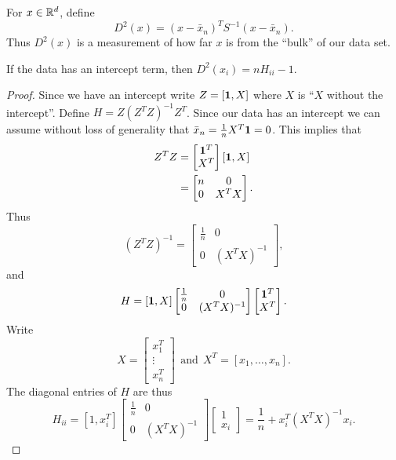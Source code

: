 For $x \in {\mathbb R}^d$, define 
\[D^2(x) = (x-\bar{x}_n)^TS^{-1}(x-\bar{x}_n). \]
Thus $D^2(x)$ is a measurement of how far $x$ is from the ``bulk'' of our data set.
\begin{prop}
    If the data has an intercept term, then $D^2(x_i) = nH_{ii}-1$.
\end{prop}
\begin{proof}
    Since we have an intercept write $Z=[{{\bf 1}}, X]$ where $X$ is ``$X$ without the intercept''. Define $H=Z(Z^TZ)^{-1}Z^T$. Since our data has an intercept we can assume without loss of generality that $\bar{x}_n = \frac{1}{n}X^T{{\bf 1}} = 0$. This implies that
    \begin{align*}
        Z^TZ &= \begin{bmatrix}
            {{\bf 1}}^T\\X^T
        \end{bmatrix}[{{\bf 1}}, X]\\
        &=\begin{bmatrix}
            n&0\\
            0&X^TX
        \end{bmatrix}.
    \end{align*} 
    Thus 
    \[(Z^TZ)^{-1} = \begin{bmatrix}
        \frac{1}{n}&0\\
        0&(X^TX)^{-1}
    \end{bmatrix}, \]
    and 
    \[H = [{{\bf 1}}, X]\begin{bmatrix}
        \frac{1}{n}&0\\
        0&(X^TX)^{-1}
    \end{bmatrix}\begin{bmatrix}
        {{\bf 1}}^T\\X^T
    \end{bmatrix}.\]
    Write 
    \[X=\begin{bmatrix}
        x_1^T\\ \vdots \\ x_n^T
    \end{bmatrix}~~ \text{and} ~~
    X^T = [x_1,\ldots, x_n]. \]
    The diagonal entries of $H$ are thus
    \[H_{ii}= [1, x_i^T]\begin{bmatrix}
        \frac{1}{n}&0\\
        0&(X^TX)^{-1}
    \end{bmatrix}\begin{bmatrix}
        1\\x_i
    \end{bmatrix} =\frac{1}{n}+x_i^T(X^TX)^{-1}x_i. \]

\end{proof}
